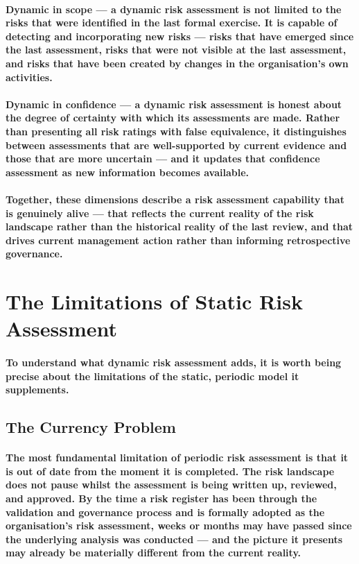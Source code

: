 \paragraph{\textbf{Dynamic in scope} — a dynamic risk assessment is not limited to the risks that were identified in the last formal exercise. It is capable of detecting and incorporating new risks — risks that have emerged since the last assessment, risks that were not visible at the last assessment, and risks that have been created by changes in the organisation's own activities.}
\paragraph{\textbf{Dynamic in confidence} — a dynamic risk assessment is honest about the degree of certainty with which its assessments are made. Rather than presenting all risk ratings with false equivalence, it distinguishes between assessments that are well-supported by current evidence and those that are more uncertain — and it updates that confidence assessment as new information becomes available.}
\paragraph{Together, these dimensions describe a risk assessment capability that is genuinely alive — that reflects the current reality of the risk landscape rather than the historical reality of the last review, and that drives current management action rather than informing retrospective governance.}

\section{The Limitations of Static Risk Assessment}
\paragraph{To understand what dynamic risk assessment adds, it is worth being precise about the limitations of the static, periodic model it supplements.}

\subsection{The Currency Problem}
\paragraph{The most fundamental limitation of periodic risk assessment is that it is out of date from the moment it is completed. The risk landscape does not pause whilst the assessment is being written up, reviewed, and approved. By the time a risk register has been through the validation and governance process and is formally adopted as the organisation's risk assessment, weeks or months may have passed since the underlying analysis was conducted — and the picture it presents may already be materially different from the current reality.}
